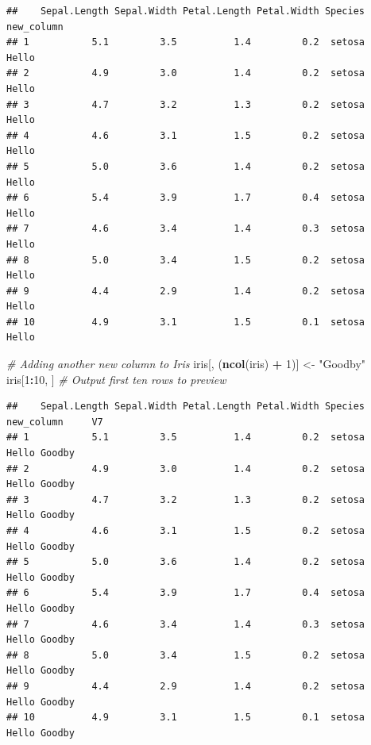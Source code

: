 \documentclass[
]{book}
\newenvironment{Shaded}{\begin{snugshade}}{\end{snugshade}}
\newcommand{\CommentTok}[1]{\textcolor[rgb]{0.56,0.35,0.01}{\textit{#1}}}
\newcommand{\DecValTok}[1]{\textcolor[rgb]{0.00,0.00,0.81}{#1}}
\newcommand{\KeywordTok}[1]{\textcolor[rgb]{0.13,0.29,0.53}{\textbf{#1}}}
\newcommand{\NormalTok}[1]{#1}
\newcommand{\OperatorTok}[1]{\textcolor[rgb]{0.81,0.36,0.00}{\textbf{#1}}}
\newcommand{\StringTok}[1]{\textcolor[rgb]{0.31,0.60,0.02}{#1}}
\begin{document}
\begin{Shaded}
\end{Shaded}

\begin{verbatim}
##    Sepal.Length Sepal.Width Petal.Length Petal.Width Species new_column
## 1           5.1         3.5          1.4         0.2  setosa      Hello
## 2           4.9         3.0          1.4         0.2  setosa      Hello
## 3           4.7         3.2          1.3         0.2  setosa      Hello
## 4           4.6         3.1          1.5         0.2  setosa      Hello
## 5           5.0         3.6          1.4         0.2  setosa      Hello
## 6           5.4         3.9          1.7         0.4  setosa      Hello
## 7           4.6         3.4          1.4         0.3  setosa      Hello
## 8           5.0         3.4          1.5         0.2  setosa      Hello
## 9           4.4         2.9          1.4         0.2  setosa      Hello
## 10          4.9         3.1          1.5         0.1  setosa      Hello
\end{verbatim}

\begin{Shaded}
\begin{Highlighting}[]
\CommentTok{# Adding another new column to Iris}
\NormalTok{iris[, (}\KeywordTok{ncol}\NormalTok{(iris) }\OperatorTok{+}\StringTok{ }\DecValTok{1}\NormalTok{)] <-}\StringTok{ "Goodby"}
\NormalTok{iris[}\DecValTok{1}\OperatorTok{:}\DecValTok{10}\NormalTok{, ]  }\CommentTok{# Output first ten rows to preview }
\end{Highlighting}
\end{Shaded}

\begin{verbatim}
##    Sepal.Length Sepal.Width Petal.Length Petal.Width Species new_column     V7
## 1           5.1         3.5          1.4         0.2  setosa      Hello Goodby
## 2           4.9         3.0          1.4         0.2  setosa      Hello Goodby
## 3           4.7         3.2          1.3         0.2  setosa      Hello Goodby
## 4           4.6         3.1          1.5         0.2  setosa      Hello Goodby
## 5           5.0         3.6          1.4         0.2  setosa      Hello Goodby
## 6           5.4         3.9          1.7         0.4  setosa      Hello Goodby
## 7           4.6         3.4          1.4         0.3  setosa      Hello Goodby
## 8           5.0         3.4          1.5         0.2  setosa      Hello Goodby
## 9           4.4         2.9          1.4         0.2  setosa      Hello Goodby
## 10          4.9         3.1          1.5         0.1  setosa      Hello Goodby
\end{verbatim}
\end{document}
